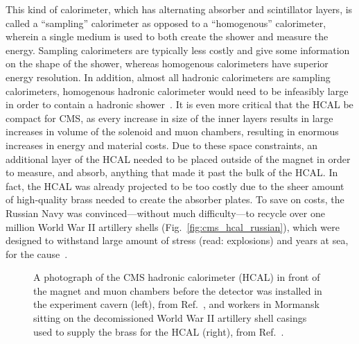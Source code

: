 This kind of calorimeter, which has alternating absorber and scintillator layers, is called a ``sampling'' calorimeter as opposed to a ``homogenous'' calorimeter, wherein a single medium is used to both create the shower and measure the energy. 
Sampling calorimeters are typically less costly and give some information on the shape of the shower, whereas homogenous calorimeters have superior energy resolution. 
In addition, almost all hadronic calorimeters are sampling calorimeters, homogenous hadronic calorimeter would need to be infeasibly large in order to contain a hadronic shower~\cite{KolanoskiWermesDetectors}. 
It is even more critical that the HCAL be compact for CMS, as every increase in size of the inner layers results in large increases in volume of the solenoid and muon chambers, resulting in enormous increases in energy and material costs. 
Due to these space constraints, an additional layer of the HCAL needed to be placed outside of the magnet in order to measure, and absorb, anything that made it past the bulk of the HCAL. 
In fact, the HCAL was already projected to be too costly due to the sheer amount of high-quality brass needed to create the absorber plates. 
To save on costs, the Russian Navy was convinced---without much difficulty---to recycle over one million World War II artillery shells (Fig.~\ref{fig:cms_hcal_russian}), which were designed to withstand large amount of stress (read: explosions) and years at sea, for the cause~\cite{CMSWebHCAL}. 

\begin{figure}[htb]
    \centering
    \quad
    \caption[A photograph of the CMS hadronic calorimeter (HCAL) and the World War II artillery shell casings that were melted down to supply the brass]{
        A photograph of the CMS hadronic calorimeter (HCAL) in front of the magnet and muon chambers before the detector was installed in the experiment cavern (left), from Ref.~\cite{Brice:1431485}, and workers in Mormansk sitting on the decomissioned World War II artillery shell casings used to supply the brass for the HCAL (right), from Ref.~\cite{GinterRussianDudes}.
    }
\end{figure}

